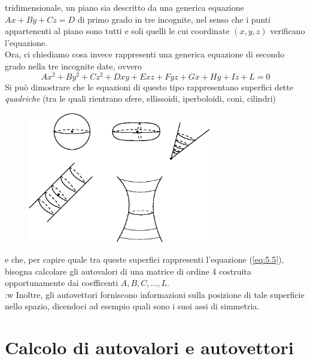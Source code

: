 \documentclass{book}
\begin{document}
\begin{enumerate}
  tridimensionale, un piano sia descritto da una generica equazione $Ax+By+Cz=D$ di primo grado in tre incognite,
  nel senso che i punti appartenenti al piano sono tutti e soli quelli le cui coordinate $(x,y,z)$ verificano
  l'equazione.\\
  Ora, ci chiediamo cosa invece rappresenti una generica equazione di secondo grado nella tre incognite date,
  ovvero
  \begin{equation}
    \label{eq:5.5}
    Ax^2+By^2+Cz^2+Dxy+Exz+Fyz+Gx+Hy+Iz+L=0
  \end{equation}
  Si può dimostrare che le equazioni di questo tipo rappresentano superfici dette \emph{quadriche} (tra le quali
  rientrano sfere, ellissoidi, iperboloidi, coni, cilindri)
  \clearpage
  \begin{figure}[ht]
    \centering
    \includegraphics[width=8cm]{img/finiti/imgex5-1-3.eps}
  \end{figure}

  e che, per capire quale tra queste superfici rappresenti l'equazione (\ref{eq:5.5}), bisogna calcolare gli
  autovalori di una matrice di ordine 4 costruita opportunamente dai coefficenti $A,B,C,\dots,L$. \\:w
  Inoltre, gli autovettori forniscono informazioni sulla posizione di tale superficie nello spazio, dicendoci ad
  esempio quali sono i suoi assi di simmetria.
\end{enumerate}

\section{Calcolo di autovalori e autovettori}
\label{sec:autovalorieautovettori}
\end{document}
